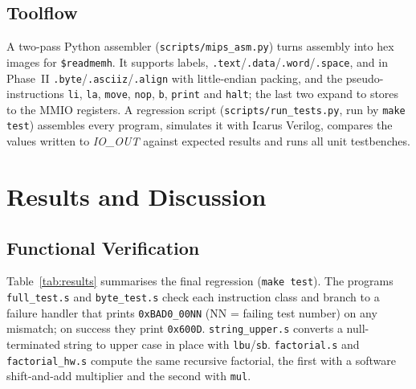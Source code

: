 \documentclass[conference]{IEEEtran}
\begin{document}
\subsection{Toolflow}
A two-pass Python assembler (\texttt{scripts/mips\_asm.py}) turns assembly into hex images for \texttt{\$readmemh}. It supports labels, \texttt{.text}/\texttt{.data}/\texttt{.word}/\texttt{.space}, and in Phase~II \texttt{.byte}/\texttt{.asciiz}/\texttt{.align} with little-endian packing, and the pseudo-instructions \texttt{li}, \texttt{la}, \texttt{move}, \texttt{nop}, \texttt{b}, \texttt{print} and \texttt{halt}; the last two expand to stores to the MMIO registers. A regression script (\texttt{scripts/run\_tests.py}, run by \texttt{make test}) assembles every program, simulates it with Icarus Verilog, compares the values written to \textit{IO\_OUT} against expected results and runs all unit testbenches.

\section{Results and Discussion}

\subsection{Functional Verification}
Table~\ref{tab:results} summarises the final regression (\texttt{make test}). The programs \texttt{full\_test.s} and \texttt{byte\_test.s} check each instruction class and branch to a failure handler that prints \texttt{0xBAD0\_00NN} (NN = failing test number) on any mismatch; on success they print \texttt{0x600D}. \texttt{string\_upper.s} converts a null-terminated string to upper case in place with \texttt{lbu}/\texttt{sb}. \texttt{factorial.s} and \texttt{factorial\_hw.s} compute the same recursive factorial, the first with a software shift-and-add multiplier and the second with \texttt{mul}.
\end{document}
